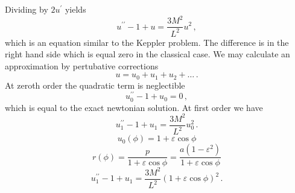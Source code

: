 Dividing by $2u^\prime$ yields
\begin{equation}
u^{\prime\prime}-1+u=\frac{3M^2}{L^2}u^2\,,
\end{equation}
which is an equation similar to the Keppler problem. The difference is in the
right hand side which is equal zero in the classical case.
We may calculate an approximation by pertubative corrections 
\begin{equation}
u=u_0+u_1+u_2+\dots\,.
\end{equation}
At zeroth order the quadratic term is neglectible
\begin{equation}
u_0^{\prime\prime}-1+u_0=0\,,
\end{equation}
which is equal to the exact newtonian solution. At first order we have
\begin{equation}
u_1^{\prime\prime}-1+u_1=\frac{3M^2}{L^2}u_0^2\,.
\end{equation}
\begin{equation}
u_0(\phi)=1+\varepsilon\cos\phi
\end{equation}
\begin{equation}
r(\phi)=\frac{p}{1+\varepsilon\cos\phi}
=\frac{a\left(1-\varepsilon^2\right)}{1+\varepsilon\cos\phi}
\end{equation}
\begin{equation}
u_1^{\prime\prime}-1+u_1=\frac{3M^2}{L^2}\left(1+\varepsilon\cos\phi\right)^2\,.
\end{equation}